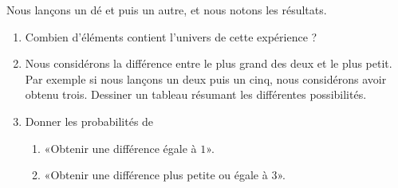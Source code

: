 
\begin{exercice}\label{exosmath-0357}

    Nous lançons un dé et puis un autre, et nous notons les résultats.
    \begin{enumerate}
        \item
            Combien d'éléments contient l'univers de cette expérience ?
        \item
            Nous considérons la différence entre le plus grand des deux et le plus petit. Par exemple si nous lançons un deux puis un cinq, nous considérons avoir obtenu trois. Dessiner un tableau résumant les différentes possibilités.
        \item
            Donner les probabilités de
            \begin{enumerate}
                \item
                    «Obtenir une différence égale à \( 1\)».
                \item
                    «Obtenir une différence plus petite ou égale à $3$».
            \end{enumerate}
    \end{enumerate}

\end{exercice}
